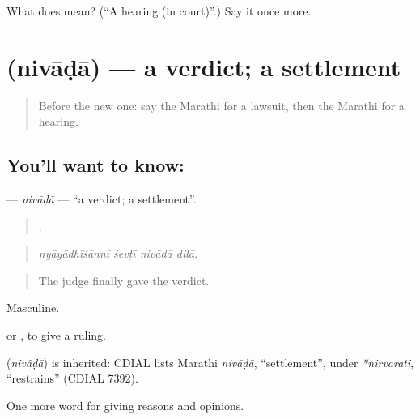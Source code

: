 \begin{tcolorbox}[breakable,colback=teal!4,colframe=teal!35!black,title={Before you move on}]
What does  mean? (\textquotedblleft{}A hearing (in court)\textquotedblright{}.) Say it once more.
\end{tcolorbox}
\section[\texorpdfstring{\mr{निवाडा} (nivāḍā)}{निवाडा (nivāḍā)}]{ (nivāḍā) — a verdict; a settlement}

\label{lesson:MR-C359-nivada}



\begin{quote}
Before the new one: say the Marathi for a lawsuit, then the Marathi for a hearing.
\end{quote}

\subsection*{You'll want to know: }
\textbf{} — \emph{nivāḍā} — \textquotedblleft{}a verdict; a settlement\textquotedblright{}.

\begin{quote}
   .
\end{quote}

\begin{quote}
\emph{nyāyādhīśānnī śevṭī nivāḍā dilā.}
\end{quote}

\begin{quote}
The judge finally gave the verdict.
\end{quote}

Masculine.

  or , to give a ruling.

\begin{cousinweb}
\textbf{} (\emph{nivāḍā}) is inherited: CDIAL lists Marathi \emph{nivāḍā}, \textquotedblleft{}settlement\textquotedblright{}, under \emph{*nirvarati}, \textquotedblleft{}restrains\textquotedblright{} (CDIAL 7392).
\end{cousinweb}

\begin{grammarlens}[title={What you've built}]
One more word for giving reasons and opinions.
\end{grammarlens}

